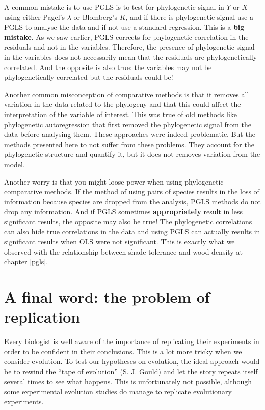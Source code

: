 \documentclass[
]{book}
\begin{document}
A common mistake is to use PGLS is to test for phylogenetic signal in \(Y\) or \(X\) using either Pagel's \(\lambda\) or Blomberg's \(K\), and if there is phylogenetic signal use a PGLS to analyse the data and if not use a standard regression. This is a \textbf{big mistake}. As we saw earlier, PGLS corrects for phylogenetic correlation in the residuals and not in the variables. Therefore, the presence of phylogenetic signal in the variables does not necessarily mean that the residuals are phylogenetically correlated. And the opposite is also true: the variables may not be phylogenetically correlated but the residuals could be!

Another common misconception of comparative methods is that it removes all variation in the data related to the phylogeny and that this could affect the interpretation of the variable of interest. This was true of old methods like phylogenetic autoregression that first removed the phylogenetic signal from the data before analysing them. These approaches were indeed problematic. But the methods presented here to not suffer from these problems. They account for the phylogenetic structure and quantify it, but it does not removes variation from the model.

Another worry is that you might loose power when using phylogenetic comparative methods. If the method of using pairs of species results in the loss of information because species are dropped from the analysis, PGLS methods do not drop any information. And if PGLS sometimes \textbf{appropriately} result in less significant results, the opposite may also be true! The phylogenetic correlations can also hide true correlations in the data and using PGLS can actually results in significant results when OLS were not significant. This is exactly what we observed with the relationship between shade tolerance and wood density at chapter \ref{pgls}.

\chapter{A final word: the problem of replication}\label{a-final-word-the-problem-of-replication}

Every biologist is well aware of the importance of replicating their experiments in order to be confident in their conclusions. This is a lot more tricky when we consider evolution. To test our hypotheses on evolution, the ideal approach would be to rewind the ``tape of evolution'' (S. J. Gould) and let the story repeats itself several times to see what happens. This is unfortunately not possible, although some experimental evolution studies do manage to replicate evolutionary experiments.
\end{document}
